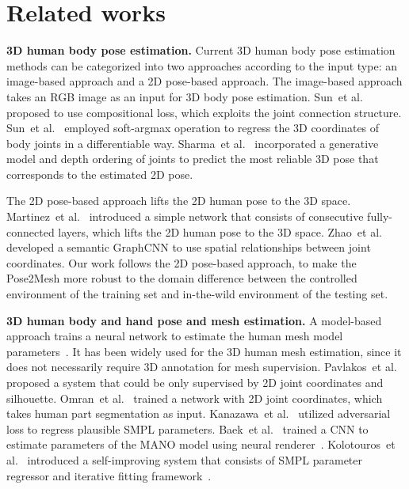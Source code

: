 \documentclass[runningheads]{llncs}
\begin{document}
 \vspace{-8mm}
\section{Related works}
\vspace{-1mm}
\noindent\textbf{3D human body pose estimation.}
Current 3D human body pose estimation methods can be categorized into two approaches according to the input type: an image-based approach and a 2D pose-based approach.
The image-based approach takes an RGB image as an input for 3D body pose estimation.
Sun~et al.~\cite{sun2017chp} proposed to use compositional loss, which exploits the joint connection structure.
Sun~et al.~\cite{sun2018integral} employed soft-argmax operation to regress the 3D coordinates of body joints in a differentiable way.
Sharma~et al.~\cite{sharma2019ordinal} incorporated a generative model and depth ordering of joints to predict the most reliable 3D pose that corresponds to the estimated 2D pose.


The 2D pose-based approach lifts the 2D human pose to the 3D space.
Martinez~et al.~\cite{martinez2017simpyet} introduced a simple network that consists of consecutive fully-connected layers, which lifts the 2D human pose to the 3D space.
Zhao~et al.~\cite{zhao2019semgcn} developed a semantic GraphCNN to use spatial relationships between joint coordinates. 
Our work follows the 2D pose-based approach, to make the Pose2Mesh more robust to the domain difference between the controlled environment of the training set and in-the-wild environment of the testing set. 

\noindent\textbf{3D human body and hand pose and mesh estimation.}
A model-based approach trains a neural network to estimate the human mesh model parameters~\cite{loper2015smpl,romero2017mano}.
It has been widely used for the 3D human mesh estimation, since it does not necessarily require 3D annotation for mesh supervision.
Pavlakos~et al.~\cite{pavlakos2018l3d} proposed a system that could be only supervised by 2D joint coordinates and silhouette. 
Omran~et al.~\cite{omran2018neural} trained a network with 2D joint coordinates, which takes human part segmentation as input.
Kanazawa~et al.~\cite{kanazawa2018hmr} utilized adversarial loss to regress plausible SMPL parameters.
Baek~et al.~\cite{baek2019pushing} trained a CNN to estimate parameters of the MANO model using neural renderer~\cite{kato2018neural}.
Kolotouros~et al.~\cite{kolotouros2019spin} introduced a self-improving system that consists of SMPL parameter regressor and iterative fitting framework~\cite{bogo2016keep}. 
\end{document}
